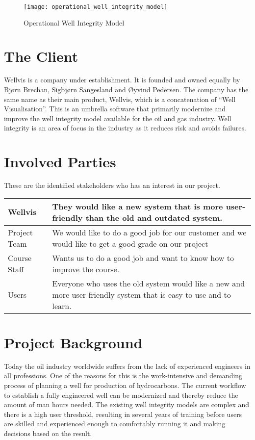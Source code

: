 \documentclass{report}
\begin{document}
\begin{figure}
    \centering
    \texttt{[image: operational\_well\_integrity\_model]}
    \caption{Operational Well Integrity Model \label{fig:owim}}
\end{figure}


\section{The Client} \label{sec:the_client}
Wellvis is a company under establishment. It is founded and owned equally by Bjørn Brechan, Sigbjørn Sangesland and Øyvind Pedersen. The company has the same name as their main product, Wellvis, which is a concatenation of “Well Visualisation”. This is an umbrella software that primarily modernize and improve the well integrity model available for the oil and gas industry. Well integrity is an area of focus in the industry as it reduces risk and avoids failures.

\section{Involved Parties} \label{sec:involved_parties}
These are the identified stakeholders who has an interest in our project.

\begin{tabular}{|l | p{8.5cm}|} \hline
Wellvis & They would like a new system that is more user-friendly than the old and outdated system. \\ \hline
Project Team & We would like to do a good job for our customer and we would like to get a good grade on our project \\ \hline
Course Staff & Wants us to do a good job and want to know how to improve the course. \\ \hline
Users & Everyone who uses the old system would like a new and more user friendly system that is easy to use and to learn. \\ \hline
\end{tabular}

\section{Project Background} \label{sec:project_background}
Today the oil industry worldwide suffers from the lack of experienced engineers in all professions. One of the reasons for this is the work-intensive and demanding process of planning a well for production of hydrocarbons. The current workflow to establish a fully engineered well can be modernized and thereby reduce the amount of man hours needed. The existing well integrity models are complex and there is a high user threshold, resulting in several years of training before users are skilled and experienced enough to comfortably running it and making decisions based on the result.
\end{document}
